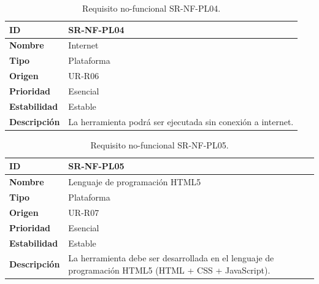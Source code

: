 \begin{center}
\begin{table}[htbp]
\centering
\caption{Requisito no-funcional SR-NF-PL04.}
\begin{tabular}{@{}p{2.5cm} p{9cm}@{}} 
\toprule
\textbf{ID} 				& SR-NF-PL04 \\
\midrule
\textbf{Nombre} 			& Internet \\
\midrule
\textbf{Tipo} 			& Plataforma \\
\midrule
\textbf{Origen} 			& UR-R06 \\
\midrule
\textbf{Prioridad}		& Esencial \\
\midrule
\textbf{Estabilidad} 		& Estable \\
\midrule
\textbf{Descripción} 	& La herramienta podrá ser ejecutada sin conexión a internet. \\
\bottomrule
\end{tabular}
\label{tab:srnfpl04}
\end{table}
\end{center}

\begin{center}
\begin{table}[htbp]
\centering
\caption{Requisito no-funcional SR-NF-PL05.}
\begin{tabular}{@{}p{2.5cm} p{9cm}@{}} 
\toprule
\textbf{ID} 				& SR-NF-PL05 \\
\midrule
\textbf{Nombre} 			& Lenguaje de programación HTML5 \\
\midrule
\textbf{Tipo} 			& Plataforma \\
\midrule
\textbf{Origen} 			& UR-R07 \\
\midrule
\textbf{Prioridad}		& Esencial \\
\midrule
\textbf{Estabilidad} 		& Estable \\
\midrule
\textbf{Descripción} 	& La herramienta debe ser desarrollada en el lenguaje de programación HTML5 (HTML + CSS + JavaScript). \\
\bottomrule
\end{tabular}
\label{tab:srnfpl05}
\end{table}
\end{center}

